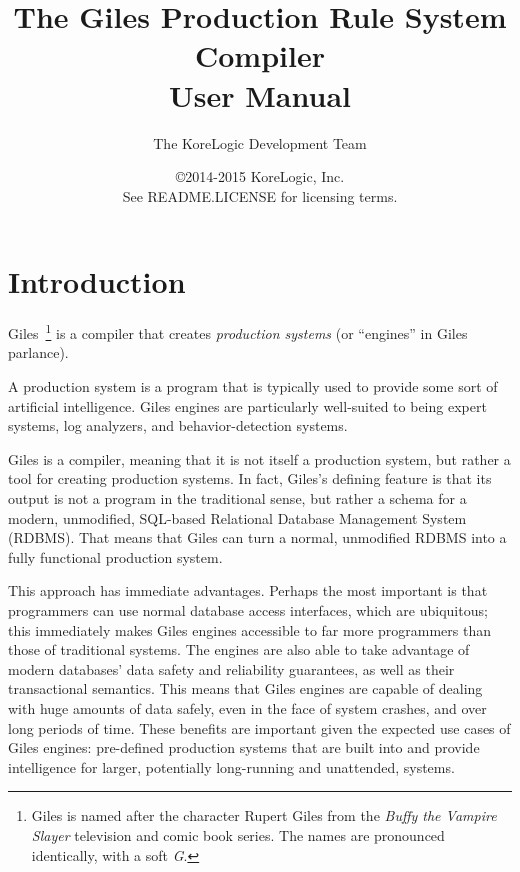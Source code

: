 \documentclass[letterpaper,10pt]{article}
\begin{document}
\title{The Giles Production Rule System Compiler \\
       {\normalsize User Manual}}
\author{The KoreLogic Development Team}
\date{\normalsize \copyright 2014-2015 KoreLogic, Inc.\\
See README.LICENSE for licensing terms.}

\maketitle

\section{Introduction}
Giles~\footnote{Giles is named after the character Rupert Giles from the \textit{Buffy the Vampire Slayer} television and comic book series. The names are pronounced identically, with a soft \emph{G}.} is a compiler that creates \emph{production systems} (or ``engines'' in Giles parlance).

A production system is a program that is typically used to provide some sort of artificial intelligence.
Giles engines are particularly well-suited to being expert systems, log analyzers, and behavior-detection systems.

Giles is a compiler, meaning that it is not itself a production system, but rather a tool for creating production systems.
In fact, Giles's defining feature is that its output is not a program in the traditional sense, but rather a schema for a modern, unmodified, SQL-based Relational Database Management System (RDBMS).
That means that Giles can turn a normal, unmodified RDBMS into a fully functional production system.

This approach has immediate advantages.
Perhaps the most important is that programmers can use normal database access interfaces, which are ubiquitous; this immediately makes Giles engines accessible to far more programmers than those of traditional systems.
The engines are also able to take advantage of modern databases' data safety and reliability guarantees, as well as their transactional semantics.
This means that Giles engines are capable of dealing with huge amounts of data safely, even in the face of system crashes, and over long periods of time.
These benefits are important given the expected use cases of Giles engines: pre-defined production systems that are built into and provide intelligence for larger, potentially long-running and unattended, systems.
\end{document}
